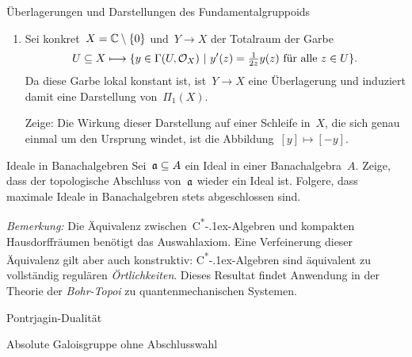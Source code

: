 \documentclass{uebblatt}
\begin{document}
\begin{aufgabe}{Überlagerungen und Darstellungen des Fundamentalgruppoids}
\begin{enumerate}
Sei~$\widetilde X$ die \emph{universelle Überlagerung} von~$X$ bezüglich eines
Basispunkts~$x_0$. Die Punkte von~$\widetilde X$ sind Homotopieklassen von
Wegen, deren Anfangspunkt~$x_0$ und deren Endpunkt beliebig ist. (Die
Homotopien müssen Anfangs- und Endpunkt bewahren.) Topologisiert wird~$\widetilde X$
als Quotientenraum eines Unterraums des Raums der Abbildungen~$[0,1] \to X$;
dieser trägt die Kompakt-Offen-Topologie. Es gibt eine kanonische stetige
Abbildung~$\pi : \widetilde X \to X$, die der Äquivalenzklasse eines Wegs ihren
Endpunkt zuordnet.

Sei dann ein beliebiger bei~$x_0$ beginnender Weg~$\gamma$ in~$X$ und
ein Urbild~$z$ von~$x_0$ unter~$\pi$ gegeben. Dann gibt es einen \emph{Lift}
von~$\gamma$ auf~$\widetilde X$, das heißt einen Weg~$\widetilde\gamma$
in~$\widetilde X$ mit~$\widetilde\gamma(0) = z$ und~$\pi \circ \widetilde\gamma
= \gamma$.

\emph{Hinweis:} Mit Notation aus Homotopietyptheorie macht der Beweis mehr
Spaß.
\item Sei konkret~$X = \mathbb{C} \setminus \{0\}$ und~$Y \to X$ der Totalraum der
Garbe
\[ U \subseteq X \longmapsto \{ y \in \Gamma(U,\mathcal{O}_X) \ |\
  \text{$y'(z) = \tfrac{1}{2z} y(z)$ für alle~$z \in U$} \}. \]
Da diese Garbe lokal konstant ist, ist~$Y \to X$ eine Überlagerung und
induziert damit eine Darstellung von~$\Pi_1(X)$.

Zeige: Die Wirkung dieser Darstellung auf einer Schleife in~$X$, die sich genau
einmal um den Ursprung windet, ist die Abbildung~$[y] \mapsto [-y]$.
\end{enumerate}
\end{aufgabe}

\begin{aufgabe}{Ideale in Banachalgebren}
Sei~$\mathfrak{a} \subseteq A$ ein Ideal in einer Banachalgebra~$A$. Zeige, dass der
topologische Abschluss von~$\mathfrak{a}$ wieder ein Ideal ist. Folgere, dass maximale
Ideale in Banachalgebren stets abgeschlossen sind.

\emph{Bemerkung:} Die Äquivalenz
zwischen~C\textsuperscript{*}\kern-.1ex-Alge\-bren und kompakten
Hausdorffräumen benötigt das Auswahlaxiom. Eine Verfeinerung dieser Äquivalenz
gilt aber auch konstruktiv: C\textsuperscript{*}\kern-.1ex-Alge\-bren sind
äquivalent zu vollständig regulären \emph{Örtlichkeiten}. Dieses Resultat
findet Anwendung in der Theorie der \emph{Bohr-Topoi} zu
quantenmechanischen Systemen.
\end{aufgabe}

\begin{aufgabe}{Pontrjagin-Dualität}
\end{aufgabe}

\begin{aufgabe}{Absolute Galoisgruppe ohne Abschlusswahl}
\end{aufgabe}
\end{document}
